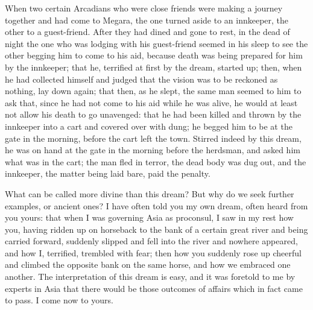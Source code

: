  When two certain Arcadians who were close friends were making a journey together and had come to Megara, the one turned aside to an innkeeper, the other to a guest-friend. After they had dined and gone to rest, in the dead of night the one who was lodging with his guest-friend seemed in his sleep to see the other begging him to come to his aid, because death was being prepared for him by the innkeeper; that he, terrified at first by the dream, started up; then, when he had collected himself and judged that the vision was to be reckoned as nothing, lay down again; that then, as he slept, the same man seemed to him to ask that, since he had not come to his aid while he was alive, he would at least not allow his death to go unavenged: that he had been killed and thrown by the innkeeper into a cart and covered over with dung; he begged him to be at the gate in the morning, before the cart left the town. Stirred indeed by this dream, he was on hand at the gate in the morning before the herdsman, and asked him what was in the cart; the man fled in terror, the dead body was dug out, and the innkeeper, the matter being laid bare, paid the penalty.

 What can be called more divine than this dream? But why do we seek further examples, or ancient ones? I have often told you my own dream, often heard from you yours: that when I was governing Asia as proconsul, I saw in my rest how you, having ridden up on horseback to the bank of a certain great river and being carried forward, suddenly slipped and fell into the river and nowhere appeared, and how I, terrified, trembled with fear; then how you suddenly rose up cheerful and climbed the opposite bank on the same horse, and how we embraced one another. The interpretation of this dream is easy, and it was foretold to me by experts in Asia that there would be those outcomes of affairs which in fact came to pass. I come now to yours.


